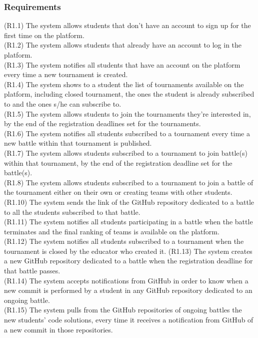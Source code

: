 \subsubsection{Requirements}
(R1.1) The system allows students that don't have an account to sign up for the first time on the platform.  \\
(R1.2) The system allows students that already have an account to log in the platform.\\
(R1.3) The system notifies all students that have an account on the platform every time a new tournament is created.\\
(R1.4) The system shows to a student the list of tournaments available on the platform, including closed tournament, the ones the student is already subscribed to and the ones s/he can subscribe to. \\
(R1.5) The system allows students to join the tournaments they’re interested in, by the end of the registration deadlines set for the tournaments.  \\
(R1.6) The system notifies all students subscribed to a tournament every time a new battle within that tournament is published.  \\
(R1.7) The system allows students subscribed to a tournament to join battle(s) within that tournament, by the end of the registration deadline set for the battle(s). \\
(R1.8) The system allows students subscribed to a tournament to join a battle of the tournament either on their own or creating teams with other students.  \\
(R1.10) The system sends the link of the GitHub repository dedicated to a battle to all the students subscribed to that battle. \\
(R1.11) The system notifies all students participating in a battle when the battle terminates and the final ranking of teams is available on the platform.  \\
(R1.12) The system notifies all students subscribed to a tournament when the tournament is closed by the educator who created it.
(R1.13) The system creates a new GitHub repository dedicated to a battle when the registration deadline for that battle passes. \\
(R1.14) The system accepts notifications from GitHub in order to know when a new commit is performed by a student in any GitHub repository dedicated to an ongoing battle.  \\
(R1.15) The system pulls from the GitHub repositories of ongoing battles the new students' code solutions, every time it receives a notification from GitHub of a new commit in those repositories.  \\
